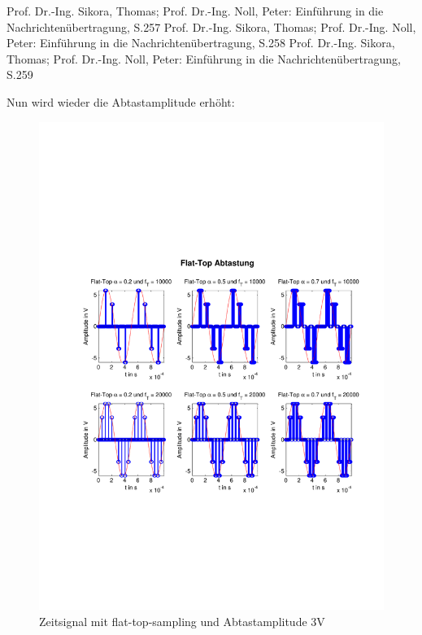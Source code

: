 

\begin{thebibliography}{999}
  Prof. Dr.-Ing. Sikora, Thomas; Prof. Dr.-Ing. Noll, Peter: Einführung in die
 Nachrichtenübertragung, S.257
 Prof. Dr.-Ing. Sikora, Thomas; Prof. Dr.-Ing. Noll, Peter: Einführung in die
 Nachrichtenübertragung, S.258
 Prof. Dr.-Ing. Sikora, Thomas; Prof. Dr.-Ing. Noll, Peter: Einführung in die
 Nachrichtenübertragung, S.259
 



\end{thebibliography}


  	    
  	    Nun wird wieder die Abtastamplitude erhöht:
  	    
  	    
  	    \begin{figure}[H]
    \centering
        \includegraphics[scale=0.7, trim = 0cm 0cm 0cm 0cm,
        clip]{./Bilder/flat-top-zeit_3V}
            \caption{Zeitsignal mit flat-top-sampling und Abtastamplitude 3V}
  	    \end{figure}
  	    
